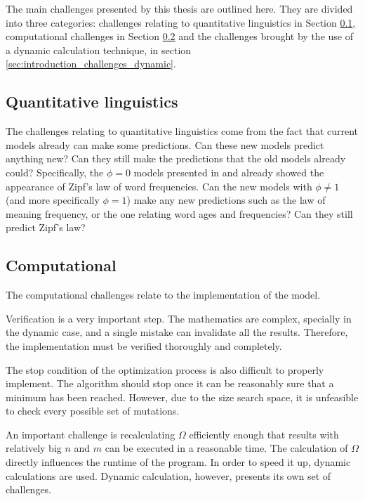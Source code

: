 The main challenges presented by this thesis are outlined here.
They are divided into three categories: challenges relating to quantitative linguistics in Section \ref{sec:introduction_challenges_quant-lin}, computational challenges in Section \ref{sec:introduction_challenges_computational} and the challenges brought by the use of a dynamic calculation technique, in section \ref{sec:introduction_challenges_dynamic}.

\subsection{Quantitative linguistics}
\label{sec:introduction_challenges_quant-lin}

The challenges relating to quantitative linguistics come from the fact that current models already can make some predictions.
Can these new models predict anything new? Can they still make the predictions that the old models already could?
Specifically, the $\phi=0$ models presented in \cite{Ferrer2005a} and \cite{Ferrer2003a} already showed the appearance of Zipf's law of word frequencies.
Can the new models with $\phi \neq 1$ (and more specifically $\phi=1$) make any new predictions such as the law of meaning frequency, or the one relating word ages and frequencies?
Can they still predict Zipf's law?

\subsection{Computational}
\label{sec:introduction_challenges_computational}

The computational challenges relate to the implementation of the model.

Verification is a very important step.
The mathematics are complex, specially in the dynamic case, and a single mistake can invalidate all the results.
Therefore, the implementation must be verified thoroughly and completely.

The stop condition of the optimization process is also difficult to properly implement.
The algorithm should stop once it can be reasonably sure that a minimum has been reached.
However, due to the size search space, it is unfeasible to check every possible set of mutations.

An important challenge is recalculating $\Omega$ efficiently enough that results with relatively big $n$ and $m$ can be executed in a reasonable time.
The calculation of $\Omega$ directly influences the runtime of the program.
In order to speed it up, dynamic calculations are used.
Dynamic calculation, however, presents its own set of challenges.

